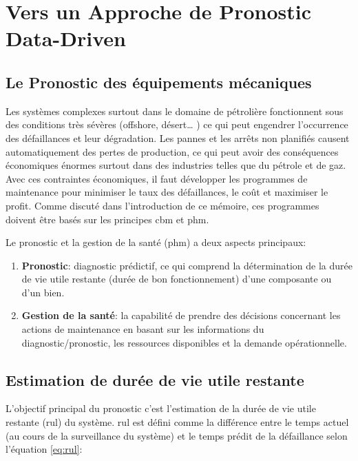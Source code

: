 \chapter{Vers un Approche de Pronostic Data-Driven}


\section{Le Pronostic des équipements mécaniques}
Les systèmes complexes surtout dans le domaine de pétrolière fonctionnent sous des conditions très sévères (offshore, désert… ) ce qui peut engendrer l’occurrence des défaillances et leur dégradation. Les pannes et les arrêts non planifiés causent automatiquement des pertes de production, ce qui peut avoir des conséquences économiques énormes surtout dans des industries telles que du pétrole et de gaz. Avec ces contraintes économiques, il faut développer les programmes de maintenance pour minimiser le taux des défaillances, le coût et maximiser le profit. Comme discuté dans l'introduction de ce mémoire, ces programmes doivent être basés sur les principes \acrlong{cbm} et \acrlong{phm}.

Le pronostic et la gestion de la santé (\acrlong{phm}) a deux aspects principaux\cite{Hess2008}:

\begin{enumerate}
    \item \textbf{Pronostic}: diagnostic prédictif, ce qui comprend la détermination de la durée de vie utile restante (durée de bon fonctionnement) d'une composante ou d'un bien.
    \item \textbf{Gestion de la santé}: la capabilité de prendre des décisions concernant les actions de maintenance en basant sur les informations du diagnostic/pronostic, les ressources disponibles et la demande opérationnelle.
\end{enumerate}

\section{Estimation de durée de vie utile restante}
L'objectif principal du pronostic c'est l'estimation de la durée de vie utile restante (\acrlong{rul}) du système.
\acrshort{rul} est défini comme la différence entre le temps actuel (au cours de la surveillance du système) et le temps prédit de la défaillance selon l'équation \ref{eq:rul}:

